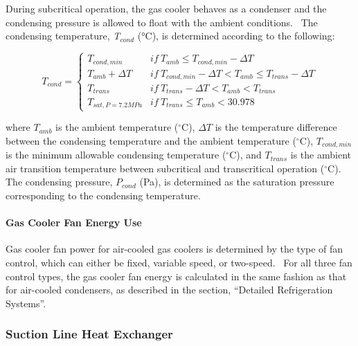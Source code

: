 During subcritical operation, the gas cooler behaves as a condenser and the condensing pressure is allowed to float with the ambient conditions.~ The condensing temperature, \emph{T\(_{cond}\)} (°C), is determined according to the following:

\begin{equation}
  T_{cond} = \left\{
               \begin{array}{cl}
                 T_{cond,min}                           & if~T_{amb} \le T_{cond,min} - \Delta T \\
                 T_{amb} + \Delta T                     & if~T_{cond,min} - \Delta T < T_{amb} \le T_{trans} - \Delta T \\
                 T_{trans}                              & if~T_{trans} - \Delta T < T_{amb} < T_{trans} \\
                 T_{sat,P = 7.2MPa}                     & if~T_{trans} \le {T_{amb}} < 30.978
               \end{array}
             \right.
\end{equation}

where \(T_{amb}\) is the ambient temperature (\(^{\circ}\)C), \(\Delta T\) is the temperature difference between the condensing temperature and the ambient temperature (\(^{\circ}\)C), \(T_{cond,min}\) is the minimum allowable condensing temperature (\(^{\circ}\)C), and \(T_{trans}\) is the ambient air transition temperature between subcritical and transcritical operation (\(^{\circ}\)C).~ The condensing pressure, \(P_{cond}\) (Pa), is determined as the saturation pressure corresponding to the condensing temperature.

\paragraph{Gas Cooler Fan Energy Use}\label{gas-cooler-fan-energy-use}

Gas cooler fan power for air-cooled gas coolers is determined by the type of fan control, which can either be fixed, variable speed, or two-speed.~ For all three fan control types, the gas cooler fan energy is calculated in the same fashion as that for air-cooled condensers, as described in the section, ``Detailed Refrigeration Systems''.

\subsubsection{Suction Line Heat Exchanger}\label{suction-line-heat-exchanger}

